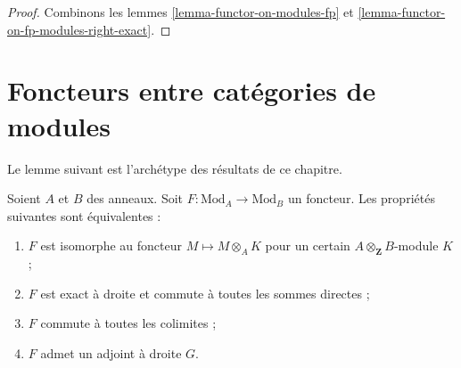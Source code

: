 \begin{proof}
Combinons les lemmes \ref{lemma-functor-on-modules-fp} et
\ref{lemma-functor-on-fp-modules-right-exact}.
\end{proof}






\section{Foncteurs entre catégories de modules}
\label{section-functors}

\noindent
Le lemme suivant est l'archétype des résultats de ce chapitre.

\begin{lemma}
\label{lemma-functor}
Soient $A$ et $B$ des anneaux. Soit $F : \text{Mod}_A \to \text{Mod}_B$
un foncteur. Les propriétés suivantes sont équivalentes :
\begin{enumerate}
\item $F$ est isomorphe au foncteur $M \mapsto M \otimes_A K$
pour un certain $A \otimes_\mathbf{Z} B$-module $K$ ;
\item $F$ est exact à droite et commute à toutes les sommes directes ;
\item $F$ commute à toutes les colimites ;
\item $F$ admet un adjoint à droite $G$.
\end{enumerate}
\end{lemma}

